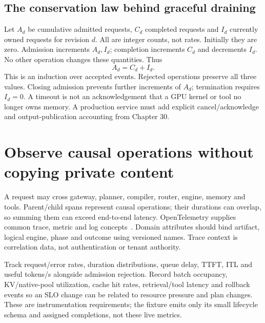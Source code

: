 \subsection{The conservation law behind graceful draining}
Let $A_d$ be cumulative admitted requests, $C_d$ completed requests and $I_d$
currently owned requests for revision $d$. All are integer counts, not rates.
Initially they are zero. Admission increments $A_d,I_d$; completion increments
$C_d$ and decrements $I_d$. No other operation changes these quantities. Thus
\begin{equation} A_d=C_d+I_d. \label{evod44:conserve}\end{equation}
This is an induction over accepted events. Rejected operations preserve all
three values. Closing admission prevents further increments of $A_d$;
termination requires $I_d=0$. A timeout is not an acknowledgement that a GPU
kernel or tool no longer owns memory. A production service must add explicit
cancel/acknowledge and output-publication accounting from Chapter 30.


\section{Observe causal operations without copying private content}
\label{evod44:observe}
A request may cross gateway, planner, compiler, router, engine, memory and
tools. Parent/child spans represent causal operations; their durations can
overlap, so summing them can exceed end-to-end latency. OpenTelemetry supplies
common trace, metric and log concepts~\cite{otel44}. Domain attributes should
bind artifact, logical engine, phase and outcome using versioned names.
Trace context is correlation data, not authentication or tenant authority.

Track request/error rates, duration distributions, queue delay, TTFT, ITL and
useful tokens/s alongside admission rejection. Record batch occupancy,
KV/native-pool utilization, cache hit rates, retrieval/tool latency and rollback
events so an SLO change can be related to resource pressure and plan changes.
These are instrumentation requirements; the fixture emits only its small
lifecycle schema and assigned completions, not these live metrics.

